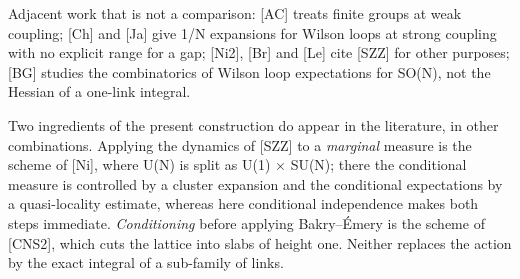 \documentclass[11pt,a4paper]{article}
\theoremstyle{named}
\begin{document}
Adjacent work that is not a comparison: [AC] treats finite groups at weak coupling; [Ch] and [Ja] give 1/N expansions for Wilson loops at strong coupling with no explicit range for a gap; [Ni2], [Br] and [Le] cite [SZZ] for other purposes; [BG] studies the combinatorics of Wilson loop expectations for SO(N), not the Hessian of a one-link integral.

Two ingredients of the present construction do appear in the literature, in other combinations. Applying the dynamics of [SZZ] to a \textit{marginal} measure is the scheme of [Ni], where U(N) is split as U(1) × SU(N); there the conditional measure is controlled by a cluster expansion and the conditional expectations by a quasi-locality estimate, whereas here conditional independence makes both steps immediate. \textit{Conditioning} before applying Bakry–Émery is the scheme of [CNS2], which cuts the lattice into slabs of height one. Neither replaces the action by the exact integral of a sub-family of links.
\end{document}

